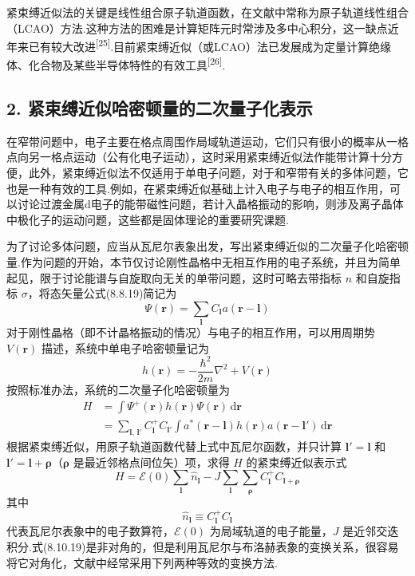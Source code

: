 紧束缚近似法的关键是线性组合原子轨道函数，在文献中常称为原子轨道线性组合（LCAO）方法.这种方法的困难是计算矩阵元时常涉及多中心积分，这一缺点近年来已有较大改进\textsuperscript{[25]}.目前紧束缚近似（或LCAO）法已发展成为定量计算绝缘体、化合物及某些半导体特性的有效工具\textsuperscript{[26]}.

\subsection*{2. 紧束缚近似哈密顿量的二次量子化表示}

在窄带问题中，电子主要在格点周围作局域轨道运动，它们只有很小的概率从一格点向另一格点运动（公有化电子运动），这时采用紧束缚近似法作能带计算十分方便，此外，紧束缚近似法不仅适用于单电子问题，对于和窄带有关的多体问题，它也是一种有效的工具.例如，在紧束缚近似基础上计入电子与电子的相互作用，可以讨论过渡金属d电子的能带磁性问题，若计入晶格振动的影响，则涉及离子晶体中极化子的运动问题，这些都是固体理论的重要研究课题.

为了讨论多体问题，应当从瓦尼尔表象出发，写出紧束缚近似的二次量子化哈密顿量.作为问题的开始，本节仅讨论刚性晶格中无相互作用的电子系统，并且为简单起见，限于讨论能谱与自旋取向无关的单带问题，这时可略去带指标 $n$ 和自旋指标 $\sigma$，将态矢量公式(8.8.19)简记为
\begin{equation}
  \Psi(\boldsymbol{r})=\sum_{\boldsymbol{l}}C_{\boldsymbol{l}}a(\boldsymbol{r}-\boldsymbol{l})
\end{equation}
对于刚性晶格（即不计晶格振动的情况）与电子的相互作用，可以用周期势 $V(\boldsymbol{r})$ 描述，系统中单电子哈密顿量记为
\begin{equation*}
  h(\boldsymbol{r})=-\frac{\hbar^{2}}{2m}\nabla^{2}+V(\boldsymbol{r})
\end{equation*}
按照标准办法，系统的二次量子化哈密顿量为
\begin{equation}
\begin{aligned}
  H&=\int\Psi^{+}(\boldsymbol{r})h(\boldsymbol{r})\Psi(\boldsymbol{r})\,\mathrm{d}\boldsymbol{r}\\
  &=\sum_{\boldsymbol{l},\,\boldsymbol{l}'}C_{\boldsymbol{l}}^{+}C_{\boldsymbol{l}'}
  \int a^{*}(\boldsymbol{r}-\boldsymbol{l})h(\boldsymbol{r})a(\boldsymbol{r}-\boldsymbol{l}')\,\mathrm{d}\boldsymbol{r}
\end{aligned}
\end{equation}
根据紧束缚近似，用原子轨道函数代替上式中瓦尼尔函数，并只计算 $\boldsymbol{l}'=\boldsymbol{l}$ 和 $\boldsymbol{l}'=\boldsymbol{l}+\boldsymbol{\rho}$（$\boldsymbol{\rho}$ 是最近邻格点间位矢）项，求得 $H$ 的紧束缚近似表示式
\begin{equation}
  H=\mathscr{E}(0)\sum_{\boldsymbol{l}}\hat{n}_{\boldsymbol{l}}-J\sum_{\boldsymbol{l}}\sum_{\boldsymbol{\rho}}C_{\boldsymbol{l}}^{+}C_{\boldsymbol{l}+\boldsymbol{\rho}}
\end{equation}
其中
\begin{equation}
  \hat{n}_{\boldsymbol{l}}\equiv C_{\boldsymbol{l}}^{+}C_{\boldsymbol{l}}
\end{equation}
代表瓦尼尔表象中的电子数算符，$\mathscr{E}(0)$ 为局域轨道的电子能量，$J$ 是近邻交迭积分.式(8.10.19)是非对角的，但是利用瓦尼尔与布洛赫表象的变换关系，很容易将它对角化，文献中经常采用下列两种等效的变换方法.


